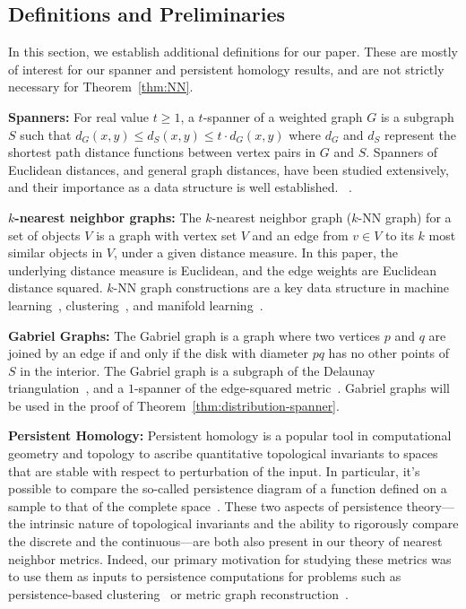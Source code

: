 
\subsection{Definitions and Preliminaries} %
\label{sec:definitions}
In this section, we establish additional definitions for our paper. These
are mostly of interest for our spanner and persistent homology results, and are not strictly
necessary for Theorem~\ref{thm:NN}.

\vspace{3 mm}

\noindent \textbf{Spanners:} For real value $t \geq 1$, a $t$-spanner of
a weighted graph $G$ is a subgraph $S$ such that $d_G(x,y) \leq d_S(x,y)
\leq t\cdot d_G(x,y)$ where $d_G$ and $d_S$ represent the shortest path
distance functions between vertex pairs in $G$ and $S$. Spanners
of Euclidean distances, and general graph distances, have been
studied extensively, and their importance as a data structure is
well established.
~\cite{Chew1986, Vaidya1991, Callahan1993,HarPeled13}.

\vspace{3 mm}
\noindent \textbf{$k$-nearest neighbor graphs:} The $k$-nearest neighbor graph
($k$-NN graph) for a set of objects $V$ is a graph with vertex set $V$
and an edge from $v\in V$ to its $k$ most similar objects in $V$, under
a given distance measure. In this paper, the underlying distance
measure is Euclidean, and the edge weights are Euclidean distance
squared.
$k$-NN
graph constructions are a key data structure in machine
learning~\cite{Dong11, Chen11}, clustering~\cite{vL09}, and manifold learning~\cite{tenenbaum00global}.

\vspace{3 mm}
\noindent \textbf{Gabriel Graphs:} The Gabriel graph is a graph where
two vertices $p$ and $q$ are joined by an edge if and only if the disk
with diameter $pq$ has no other points of $S$ in the interior. The
Gabriel graph is a subgraph of the Delaunay
triangulation~\cite{SridharMaster}, and a
$1$-spanner of the edge-squared metric~\cite{SridharMaster}. Gabriel
graphs will be used in the proof of
Theorem~\ref{thm:distribution-spanner}.

\vspace{3 mm}
\noindent \textbf{Persistent Homology:}
  Persistent homology is a popular tool in computational geometry and topology to ascribe quantitative topological invariants to spaces that are stable with respect to perturbation of the input.
  In particular, it's possible to compare the so-called persistence diagram of a function defined on a sample to that of the complete space~\cite{chazal08towards}.
  These two aspects of persistence theory---the intrinsic nature of topological invariants and the ability to rigorously compare the discrete and the continuous---are both also present in our theory of nearest neighbor metrics.
  Indeed, our primary motivation for studying these metrics was to use them as inputs to persistence computations for problems such as persistence-based clustering~\cite{chazal13persistence} or metric graph reconstruction~\cite{aanjaneya12metric}.

